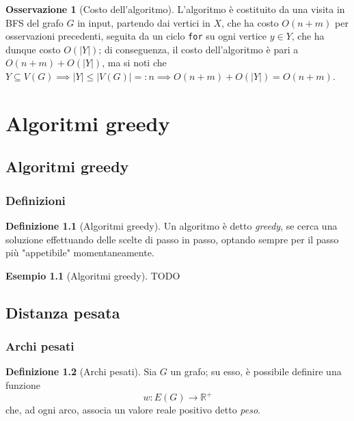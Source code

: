 \documentclass[14pt]{extreport}
\theoremstyle{definition}
\newtheorem{definition}{Definizione}[subsection]
\theoremstyle{definition}
\newtheorem{remark}{Osservazione}[subsection]
\newtheorem{example}{Esempio}[subsection]
\begin{document}
\begin{remark}[Costo dell'algoritmo]
    L'algoritmo è costituito da una visita in BFS del grafo $G$ in input, partendo dai vertici in $X$, che ha costo $O(n + m)$ per osservazioni precedenti, seguita da un ciclo \texttt{for} su ogni vertice $y \in Y$, che ha dunque costo $O(|Y|)$; di conseguenza, il costo dell'algoritmo è pari a $O(n + m) + O(|Y|)$, ma si noti che $Y \subseteq V(G) \implies |Y| \le |V(G)| =: n \implies O(n + m) + O(|Y|) = O(n + m)$.
\end{remark}

\chapter{Algoritmi greedy}

\section{Algoritmi greedy}

\subsection{Definizioni}

\begin{definition}[Algoritmi greedy]
    Un algoritmo è detto \textit{greedy}, se cerca una soluzione effettuando delle scelte di passo in passo, optando sempre per il passo più "appetibile" momentaneamente.
\end{definition}

\begin{example}[Algoritmi greedy]
    TODO
\end{example}

\section{Distanza pesata}

\subsection{Archi pesati}

\begin{definition}[Archi pesati]
    Sia $G$ un grafo; su esso, è possibile definire una funzione $$w: E(G) \rightarrow \mathbb{R}^+$$ che, ad ogni arco, associa un valore reale positivo detto \textit{peso}.
\end{definition}
\end{document}
